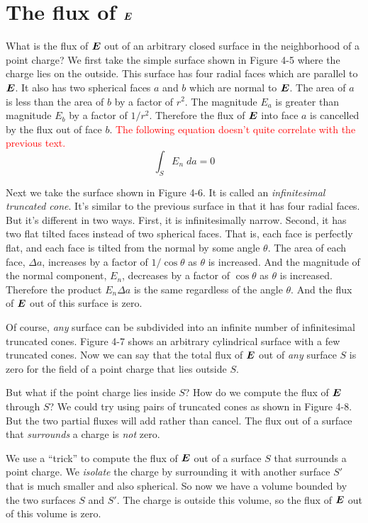 \section{The flux of $\boldsymbol{E}$}

What is the flux of $\boldsymbol{E}$ out of an arbitrary closed surface
in the neighborhood of a point charge?
We first take the simple surface shown in Figure 4-5 where the charge lies on the outside.
This surface has four radial faces which are parallel to $\boldsymbol{E}$.
It also has two spherical faces $a$ and $b$ which are normal to $\boldsymbol{E}$.
The area of $a$ is less than the area of $b$ by a factor of $r^2$.
The magnitude $E_a$ is greater than magnitude $E_b$ by a factor of $1/r^2$.
Therefore the flux of $\boldsymbol{E}$ into face $a$ is cancelled by the flux out of face $b$.
\textcolor{red}{The following equation doesn't quite correlate with the previous text.}
\begin{equation}
  \int_S E_n \; da = 0
\end{equation}

Next we take the surface shown in Figure 4-6.
It is called an \emph{infinitesimal truncated cone}.
It's similar to the previous surface in that it has four radial faces.
But it's different in two ways. First, it is infinitesimally narrow. Second, 
it has two flat tilted faces instead of two spherical faces. That is, each face 
is perfectly flat, and each face is tilted from the normal by some angle $\theta$.
The area of each face, $\Delta a$, increases by a factor of $1/\cos\theta$ as $\theta$ is increased.
And the magnitude of the normal component, $E_n$, decreases by a factor of $\cos\theta$
as $\theta$ is increased.
Therefore the product $E_n \Delta a$ is the same regardless of the angle $\theta$.
And the flux of $\boldsymbol{E}$ out of this surface is zero.

Of course, \emph{any} surface can be subdivided into an infinite number of
infinitesimal truncated cones.
Figure 4-7 shows an arbitrary cylindrical surface with a few truncated cones.
Now we can say that the total flux of $\boldsymbol{E}$ out of \emph{any} surface $S$ is zero
for the field of a point charge that lies outside $S$.

But what if the point charge lies inside $S$?
How do we compute the flux of $\boldsymbol{E}$ through $S$?
We could try using pairs of truncated cones as shown in Figure 4-8.
But the two partial fluxes will add rather than cancel.
The flux out of a surface that \emph{surrounds} a charge is \emph{not} zero.

We use a ``trick'' to compute the flux of $\boldsymbol{E}$ 
out of a surface $S$ that surrounds a point charge.
We \emph{isolate} the charge by surrounding it with another surface $S'$
that is much smaller and also spherical.
So now we have a volume bounded by the two surfaces $S$ and $S'$.
The charge is outside this volume, so the flux of $\boldsymbol{E}$ out of this volume is zero.

